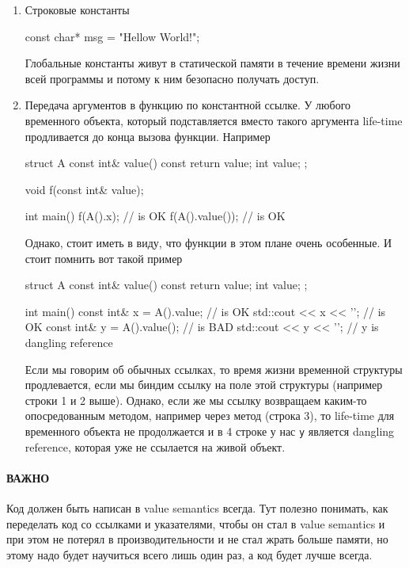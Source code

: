 \begin{enumerate}
\item Строковые константы
\begin{cppcode}
const char* msg = "Hellow World!";
\end{cppcode}
Глобальные константы живут в статической памяти в течение времени жизни всей программы и потому к ним безопасно получать доступ.

\item Передача аргументов в функцию по константной ссылке.
У любого временного объекта, который подставляется вместо такого аргумента life-time продливается до конца вызова функции.
Например
\begin{cppcode}
struct A {
  const int& value() const {
    return value;
  }
  int value;
};

void f(const int& value);

int main() {
  f(A().x); // is OK
  f(A().value()); // is OK
}
\end{cppcode}
Однако, стоит иметь в виду, что функции в этом плане очень особенные.
И стоит помнить вот такой пример
\begin{cppcode}
struct A {
  const int& value() const {
    return value;
  }
  int value;
};

int main() {
  const int& x = A().value; // is OK
  std::cout << x << '\n'; // is OK
  const int& y = A().value(); // is BAD
  std::cout << y << '\n'; // y is dangling reference
}
\end{cppcode}
Если мы говорим об обычных ссылках, то время жизни временной структуры продлевается, если мы биндим ссылку на поле этой структуры (например строки 1 и 2 выше).
Однако, если же мы ссылку возвращаем каким-то опосредованным методом, например через метод (строка 3), то life-time для временного объекта не продолжается и в 4 строке у нас \verb"y" является dangling reference, которая уже не ссылается на живой объект.
\end{enumerate}

\paragraph{ВАЖНО} Код должен быть написан в value semantics всегда.
Тут полезно понимать, как переделать код со ссылками и указателями, чтобы он стал в value semantics и при этом не потерял в производительности и не стал жрать больше памяти, но этому надо будет научиться всего лишь один раз, а код будет лучше всегда.
